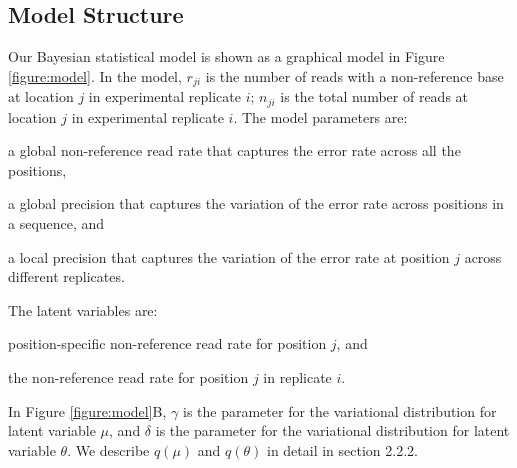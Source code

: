 \documentclass{bmcart}
\begin{document}
\subsection{Model Structure}
Our Bayesian statistical model is shown as a graphical model in Figure \ref{figure:model}.
In the model, $r_{ji}$ is the number of reads with a non-reference base at location $j$ in experimental replicate $i$; $n_{ji}$ is the total number of reads at location $j$ in experimental replicate $i$.
The model parameters are:
\begin{description}[noitemsep]
  \item[$- \ \mu_0$] a global non-reference read rate that captures the error rate across all the positions,
  \item[$- \ M_0$] a global precision that captures the variation of the error rate across positions in a sequence, and
  \item[$- \ M_j$] a local precision that captures the variation of the error rate at position $j$ across different replicates.
\end{description}
The latent variables are:
\begin{description}[noitemsep]
  \item[$- \ \mu_j \sim \text{Beta}(\mu_0, M_0)$] position-specific non-reference read rate for position $j$, and
  \item[$- \ \theta_{ji} \sim \text{Beta}(\mu_j, M_j)$] the non-reference read rate for position $j$ in replicate $i$.
\end{description}

In Figure \ref{figure:model}B, $\gamma$ is the parameter for the variational distribution for latent variable $\mu$,
and $\delta$ is the parameter for the variational distribution for latent variable $\theta$.
We describe $q(\mu)$ and $q(\theta)$ in detail in section 2.2.2.

\end{document}
